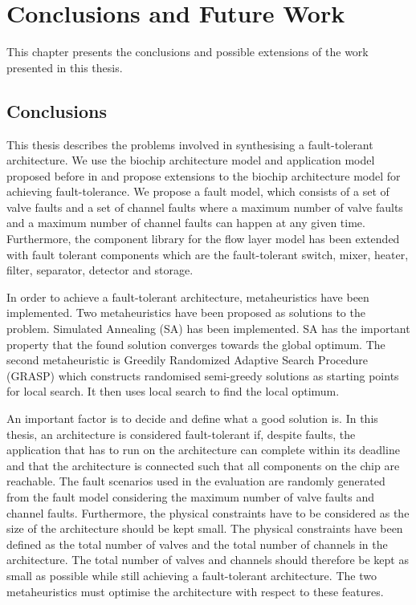 \chapter{Conclusions and Future Work}
\label{chap:conclusions}
This chapter presents the conclusions and possible extensions of the work presented in this thesis.

\section{Conclusions}
This thesis describes the problems involved in synthesising a fault-tolerant architecture. We use the biochip architecture model and application model proposed before in \cite{wajid} and propose extensions to the biochip architecture model for achieving fault-tolerance. We propose a fault model, which consists of a set of valve faults and a set of channel faults where a maximum number of valve faults and a maximum number of channel faults can happen at any given time. Furthermore, the component library for the flow layer model has been extended with fault tolerant components which are the fault-tolerant switch, mixer, heater, filter, separator, detector and storage.

In order to achieve a fault-tolerant architecture, metaheuristics have been implemented. Two metaheuristics have been proposed as solutions to the problem. Simulated Annealing (SA) has been implemented. SA has the important property that the found solution converges towards the global optimum. The second metaheuristic is Greedily Randomized Adaptive Search Procedure (GRASP) which constructs randomised semi-greedy solutions as starting points for local search. It then uses local search to find the local optimum.

An important factor is to decide and define what a good solution is. In this thesis, an architecture is considered fault-tolerant if, despite faults, the application that has to run on the architecture can complete within its deadline and that the architecture is connected such that all components on the chip are reachable. The fault scenarios used in the evaluation are randomly generated from the fault model considering the maximum number of valve faults and channel faults. Furthermore, the physical constraints have to be considered as the size of the architecture should be kept small. The physical constraints have been defined as the total number of valves and the total number of channels in the architecture. The total number of valves and channels should therefore be kept as small as possible while still achieving a fault-tolerant architecture. The two metaheuristics must optimise the architecture with respect to these features.

